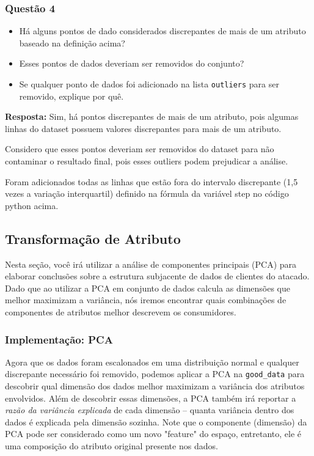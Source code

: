 \documentclass[11pt]{article}
\providecommand{\tightlist}{%
      \setlength{\itemsep}{0pt}\setlength{\parskip}{0pt}}
\begin{document}
    
    \subsubsection{Questão 4}\label{questuxe3o-4}

\begin{itemize}
\tightlist
\item
  Há alguns pontos de dado considerados discrepantes de mais de um
  atributo baseado na definição acima?
\item
  Esses pontos de dados deveriam ser removidos do conjunto?
\item
  Se qualquer ponto de dados foi adicionado na lista \texttt{outliers}
  para ser removido, explique por quê.
\end{itemize}

    \textbf{Resposta:} Sim, há pontos discrepantes de mais de um atributo,
pois algumas linhas do dataset possuem valores discrepantes para mais de
um atributo.

Considero que esses pontos deveriam ser removidos do dataset para não
contaminar o resultado final, pois esses outliers podem prejudicar a
análise.

Foram adicionados todas as linhas que estão fora do intervalo
discrepante (1,5 vezes a variação interquartil) definido na fórmula da
variável step no código python acima.

    \subsection{Transformação de
Atributo}\label{transformauxe7uxe3o-de-atributo}

Nesta seção, você irá utilizar a análise de componentes principais (PCA)
para elaborar conclusões sobre a estrutura subjacente de dados de
clientes do atacado. Dado que ao utilizar a PCA em conjunto de dados
calcula as dimensões que melhor maximizam a variância, nós iremos
encontrar quais combinações de componentes de atributos melhor descrevem
os consumidores.

    \subsubsection{Implementação: PCA}\label{implementauxe7uxe3o-pca}

Agora que os dados foram escalonados em uma distribuição normal e
qualquer discrepante necessário foi removido, podemos aplicar a PCA na
\texttt{good\_data} para descobrir qual dimensão dos dados melhor
maximizam a variância dos atributos envolvidos. Além de descobrir essas
dimensões, a PCA também irá reportar a \emph{razão da variância
explicada} de cada dimensão -- quanta variância dentro dos dados é
explicada pela dimensão sozinha. Note que o componente (dimensão) da PCA
pode ser considerado como um novo "feature" do espaço, entretanto, ele é
uma composição do atributo original presente nos dados.
\end{document}
